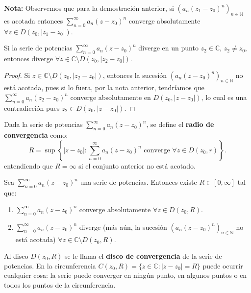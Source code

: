 \textbf{Nota:} Observemos que para la demostración anterior, si $(a_n (z_1 - z_0)^n)_{n\in\mathbb{N}}$ es acotada entonces $\sum_{n=0}^{\infty} a_n (z - z_0)^n$ converge absolutamente $\forall z \in D(z_0, |z_1 - z_0|)$.

\begin{corolario}
    Si la serie de potencias $\sum_{n=0}^{\infty} a_n (z - z_0)^n$ diverge en un punto $z_2 \in \mathbb{C}$, $z_2 \neq z_0$, entonces diverge $\forall z \in \mathbb{C} \setminus D(z_0, |z_2 - z_0|)$.
\end{corolario}

\begin{proof}
    Si $z \in \mathbb{C} \setminus D(z_0, |z_2 - z_0|)$, entonces la sucesión $(a_n (z - z_0)^n)_{n\in\mathbb{N}}$ no está acotada, pues si lo fuera, por la nota anterior, tendríamos que $\sum_{n=0}^{\infty} a_n (z_2 - z_0)^n$ converge absolutamente en $D(z_0, |z - z_0|)$, lo cual es una contradicción pues $z_2 \in D(z_0, |z - z_0|)$.
\end{proof}

\begin{definición}
    Dada la serie de potencias $\sum_{n=0}^{\infty} a_n (z - z_0)^n$, se define el \textbf{radio de convergencia} como:
    \[
        R = \sup\left\{|z-z_0| : \sum_{n=0}^{\infty} a_n (z - z_0)^n \text{ converge } \forall z \in D(z_0, r)\right\}.
    \]
    entendiendo que $R = \infty$ si el conjunto anterior no está acotado.
\end{definición}

\begin{teorema}
    Sea $\sum_{n=0}^{\infty} a_n (z - z_0)^n$ una serie de potencias. Entonces existe $R \in [0, \infty]$ tal que:
    \begin{enumerate}
        \item $\sum_{n=0}^{\infty} a_n (z - z_0)^n$ converge absolutamente $\forall z \in D(z_0, R)$.
        \item $\sum_{n=0}^{\infty} a_n (z - z_0)^n$ diverge (más aún, la sucesión $(a_n (z - z_0)^n)_{n\in\mathbb{N}}$ no está acotada) $\forall z \in \mathbb{C} \setminus D(z_0, R)$.
    \end{enumerate}
\end{teorema}

Al disco $D(z_0, R)$ se le llama el \textbf{disco de convergencia} de la serie de potencias. En la circunferencia $C(z_0, R) = \{z \in \mathbb{C} : |z - z_0| = R\}$ puede ocurrir cualquier cosa: la serie puede converger en ningún punto, en algunos puntos o en todos los puntos de la circunferencia.

